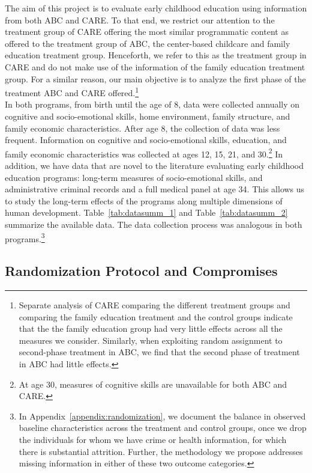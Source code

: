 \noindent The aim of this project is to evaluate early childhood education using information from both ABC and CARE. To that end, we restrict our attention to the treatment group of CARE offering the most similar programmatic content as offered to the treatment group of ABC, the center-based childcare and family education treatment group. Henceforth, we refer to this as the treatment group in CARE and do not make use of the information of the family education treatment group. For a similar reason, our main objective is to analyze the first phase of the treatment ABC and CARE offered.\footnote{Separate analysis of CARE comparing the different treatment groups and comparing the family education treatment and the control groups indicate that the the family education group had very little effects across all the measures we consider. Similarly, when exploiting random assignment to second-phase treatment in ABC, we find that the second phase of treatment in ABC had little effects.}\\

\noindent In both programs, from birth until the age of 8, data were collected annually on cognitive and socio-emotional skills, home environment, family structure, and family economic characteristics. After age 8, the collection of data was less frequent. Information on cognitive and socio-emotional skills, education, and family economic characteristics was collected at ages 12, 15, 21, and 30.\footnote{At age 30, measures of cognitive skills are unavailable for both ABC and CARE.} In addition, we have data that are novel to the literature evaluating early childhood education programs: long-term measures of socio-emotional skills, and administrative criminal records and a full medical panel at age 34. This allows us to study the long-term effects of the programs along multiple dimensions of human development. Table~\ref{tab:datasumm_1} and Table~\ref{tab:datasumm_2} summarize the available data. The data collection process was analogous in both programs.\footnote{In Appendix~\ref{appendix:randomization}, we document the balance in observed baseline characteristics across the treatment and control groups, once we drop the individuals for whom we have crime or health information, for which there is substantial attrition. Further, the methodology we propose addresses missing information in either of these two outcome categories.}



\subsection{Randomization Protocol and Compromises} \label{section:randomization}

